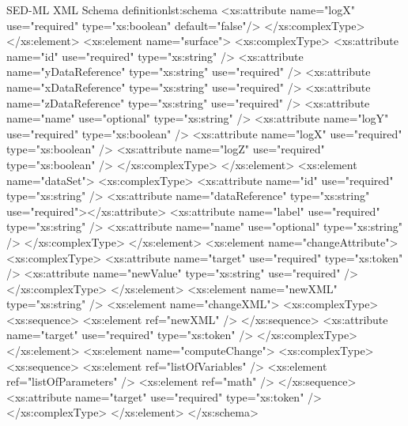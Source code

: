 \begin{myXmlLst}{SED-ML XML Schema definition}{lst:schema}
			<xs:attribute name="logX" use="required" type="xs:boolean" default="false"/>
		</xs:complexType>
	</xs:element>
	<xs:element name="surface">
		<xs:complexType>
			<xs:attribute name="id" use="required" type="xs:string" />
			<xs:attribute name="yDataReference" type="xs:string"
				use="required" />
			<xs:attribute name="xDataReference" type="xs:string"
				use="required" />
			<xs:attribute name="zDataReference" type="xs:string"
				use="required" />
			<xs:attribute name="name" use="optional" type="xs:string" />
			<xs:attribute name="logY" use="required" type="xs:boolean" />
			<xs:attribute name="logX" use="required" type="xs:boolean" />
			<xs:attribute name="logZ" use="required" type="xs:boolean" />
		</xs:complexType>
	</xs:element>
	<xs:element name="dataSet">
		<xs:complexType>
			<xs:attribute name="id" use="required" type="xs:string" />
			<xs:attribute name="dataReference" type="xs:string" use="required"></xs:attribute>
			<xs:attribute name="label" use="required" type="xs:string" />
			<xs:attribute name="name" use="optional" type="xs:string" />
		</xs:complexType>
	</xs:element>
	<xs:element name="changeAttribute">
		<xs:complexType>
			<xs:attribute name="target" use="required" type="xs:token" />
			<xs:attribute name="newValue" type="xs:string" use="required" />
		</xs:complexType>
	</xs:element>
 	<xs:element name="newXML" type="xs:string" />
	<xs:element name="changeXML">
		<xs:complexType>
			<xs:sequence>
				<xs:element ref="newXML" />
			</xs:sequence>
			<xs:attribute name="target" use="required" type="xs:token" />
		</xs:complexType>
	</xs:element>	
	<xs:element name="computeChange">
		<xs:complexType>
			<xs:sequence>
				<xs:element ref="listOfVariables" />
				<xs:element ref="listOfParameters" />
				<xs:element ref="math" />
			</xs:sequence>
			<xs:attribute name="target" use="required" type="xs:token" />
		</xs:complexType>
	</xs:element>
</xs:schema>
\end{myXmlLst}

